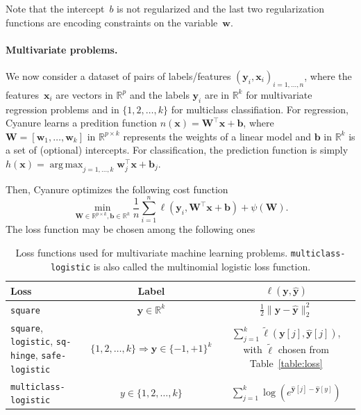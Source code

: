 \documentclass{article}
\def\x{{\mathbf{x}}}
\def\y{{\mathbf{y}}}
\def\w{{\mathbf{w}}}
\def\W{{\mathbf{W}}}
\def\b{{\mathbf{b}}}
\def\wb{{\mathbf{w}}}
\def\Real{{\mathbb{R}}}
\DeclareMathOperator*{\argmax}{arg\,max}
\begin{document}
Note that the intercept~$b$ is not regularized and the last two regularization
functions are encoding constraints on the variable~$\wb$.

\paragraph{Multivariate problems.}
We now consider a dataset of pairs of
labels/features $(\y_i,\x_i)_{i=1,\ldots,n}$, where the features~$\x_i$ are
vectors in $\Real^p$ and the labels $\y_i$ are in $\Real^k$ for multivariate regression
problems and in $\{1,2,\ldots,k\}$ for multiclass classifiation.
For regression, 
Cyanure learns a predition function $n(\x)= \W^\top \x + \b$, where $\W=[\w_1,\ldots,\w_k]$ in
$\Real^{p \times k}$ represents the weights of a linear model and $\b$ in $\Real^k$ is a set of (optional)
intercepts.
For classification, the prediction function is simply $h(\x)= \argmax_{j=1,\ldots,k} \w_j^\top \x + \b_j$.

Then, Cyanure optimizes the following cost function
\begin{displaymath}
   \min_{\W \in \Real^{p \times k}, \b \in \Real^k} \frac{1}{n}\sum_{i=1}^n \ell(\y_i, \W^\top \x + \b)  + \psi(\W). 
\end{displaymath}
The loss function may be chosen among the following ones
\begin{table}[h!]
   \centering
   \begin{tabular}{|p{3.5cm}|c|c|}
      \hline
      Loss  & Label  &  $\ell(\y, \hat{\y})$ \\  
      \hline
      \texttt{square} &  $\y \in \Real^k$ &  $\frac{1}{2}\|\y-\hat{\y}\|_2^2$ \\ 
      \hline
      \texttt{square},  
      \texttt{logistic},  
      \texttt{sq-hinge},
      \texttt{safe-logistic} &  $\{1,2,\ldots,k\} \Rightarrow \y \in \{-1,+1\}^k$  &  $\sum_{j=1}^k \tilde{\ell}(\y[j], \hat{\y}[j])$, with $\tilde{\ell}$ chosen from Table~\ref{table:loss}   \\ 
      \hline
      \texttt{multiclass-logistic} & $y \in \{1,2,\ldots,k\}$ &  $\sum_{j=1}^k \log\left(e^{\hat{\y}[j] - \hat{\y}[y]}  \right)  $  \\
      \hline
   \end{tabular}
   \caption{Loss functions used for multivariate machine learning problems. \texttt{multiclass-logistic} is also called the multinomial logistic loss function.}
\end{table}
\end{document}
